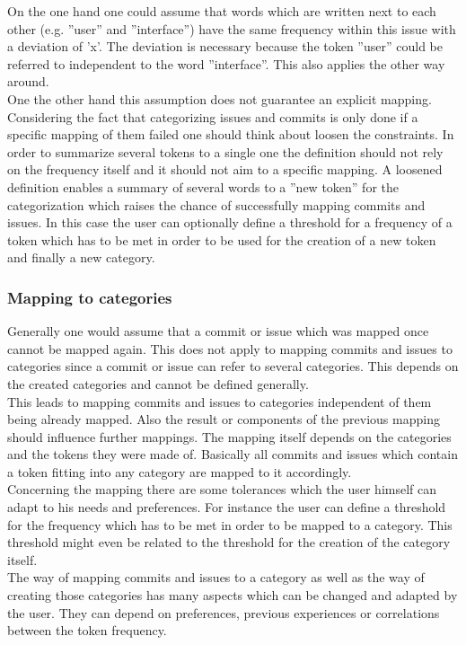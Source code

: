 On the one hand one could assume that words which are written next to each other (e.g. ''user'' and  ''interface'') have the same frequency within this issue with a deviation of 'x'.
The deviation is necessary because the token ''user'' could be referred to independent to the word ''interface''.
This also applies the other way around. \\

One the other hand this assumption does not guarantee an explicit mapping.
Considering the fact that categorizing issues and commits is only done if a specific mapping of them failed one should think about loosen the constraints.
In order to summarize several tokens to a single one the definition should not rely on the frequency itself and it should not aim to a specific mapping.
A loosened definition enables a summary of several words to a ''new token'' for the categorization which raises the chance of successfully mapping commits and issues.
In this case the user can optionally define a threshold for a frequency of a token which has to be met in order to be used for the creation of a new token and finally a new category.


\subsubsection{Mapping to categories}

Generally one would assume that a commit or issue which was mapped once cannot be mapped again.
This does not apply to mapping commits and issues to categories since a commit or issue can refer to several categories.
This depends on the created categories and cannot be defined generally.\\
This leads to mapping commits and issues to categories independent of them being already mapped.
Also the result or components of the previous mapping should influence further mappings.
The mapping itself depends on the categories and the tokens they were made of.
Basically all commits and issues which contain a token fitting into any category are mapped to it accordingly. \\

Concerning the mapping there are some tolerances which the user himself can adapt to his needs and preferences.
For instance the user can define a threshold for the frequency which has to be met in order to be mapped to a category.
This threshold might even be related to the threshold for the creation of the category itself. \\

The way of mapping commits and issues to a category as well as the way of creating those categories has many aspects which can be changed and adapted by the user.
They can depend on preferences, previous experiences or correlations between the token frequency.

